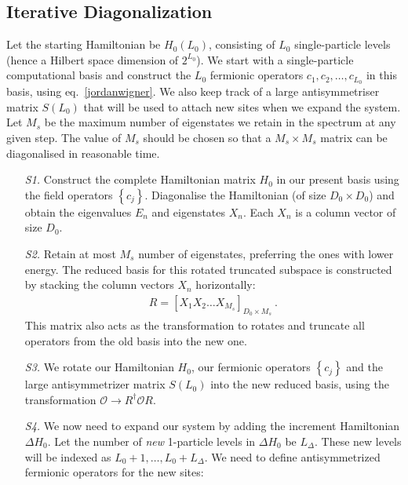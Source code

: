 \documentclass[reprint]{revtex4-2}
\begin{document}
\subsection{Iterative Diagonalization}
Let the starting Hamiltonian be \(H_0(L_0)\), consisting of \(L_0\) single-particle levels (hence a Hilbert space dimension of \(2^{L_0}\)). We start with a single-particle computational basis and construct the \(L_0\) fermionic operators \(c_1, c_2, \ldots, c_{L_0}\) in this basis, using eq.~\ref{jordanwigner}. We also keep track of a large antisymmetriser matrix \(S(L_0)\) that will be used to attach new sites when we expand the system. Let \(M_s\) be the maximum number of eigenstates we retain in the spectrum at any given step. The value of \(M_s\) should be chosen so that a \(M_s\times M_s\) matrix can be diagonalised in reasonable time.
\begin{itemize}
	\item[{\it S1.}] Construct the complete Hamiltonian matrix \(H_0\) in our present basis using the field operators \(\left\{c_j\right\}\). Diagonalise the Hamiltonian (of size \(D_0 \times D_0\)) and obtain the eigenvalues \({E_n}\) and eigenstates \({X_n}\). Each \(X_n\) is a column vector of size \(D_0\).
	\item[{\it S2.}] Retain at most \(M_s\) number of eigenstates, preferring the ones with lower energy. The reduced basis for this rotated truncated subspace is constructed by stacking the column vectors \(X_n\) horizontally:
		\begin{equation}\begin{aligned}\label{rotationMatrix}
			R = [X_1 X_2 \ldots X_{M_s}]_{D_0\times M_s}~.
		\end{aligned}\end{equation}
		This matrix also acts as the transformation to rotates and truncate all operators from the old basis into the new one.
	\item[{\it S3.}] We rotate our Hamiltonian \(H_0\), our fermionic operators \(\left\{ c_j \right\} \) and the large antisymmetrizer matrix \(S(L_0)\) into the new reduced basis, using the transformation \(\mathcal{O} \to R^\dagger \mathcal{O} R\).
	\item[{\it S4.}] We now need to expand our system by adding the increment Hamiltonian \(\Delta H_0\). Let the number of {\it new } 1-particle levels in \(\Delta H_0\) be \(L_\Delta\). These new levels will be indexed as \(L_0+1,\ldots,L_0+L_\Delta\). We need to define antisymmetrized fermionic operators for the new sites:
		\begin{equation}\begin{aligned}

\end{aligned}
\end{equation}
\end{itemize}
\end{document}
